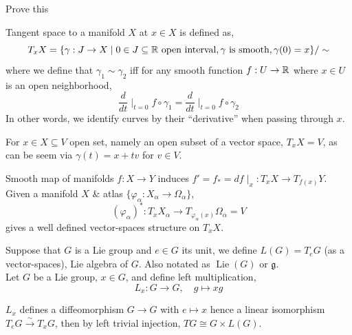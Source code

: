 \begin{exercise}
	Prove this
\end{exercise}
\begin{definition}
	Tangent space to a manifold $X$ at $x \in X$ is defined as,
	\[
		T_x X
		= \{ \gamma : J \to X \mid 0 \in J \subseteq \mathbb{R} \text{ open interval}, \gamma \text{ is smooth}, \gamma(0) = x \} / \sim
	\]
	where we define that $\gamma_1 \sim \gamma_2$ iff for any smooth function $f : U \to \mathbb{R}$ where $x \in U$ is an open neighborhood, 
	\[
		\frac{d}{dt} \mid_{t = 0} f \circ \gamma_1
		= \frac{d}{dt} \mid_{t = 0} f \circ \gamma_2
	\]
	In other words, we identify curves by their ``derivative'' when passing through $x$.
\end{definition}
\begin{example}
	For $x \in X \subseteq V$ open set, namely an open subset of a vector space, $T_x X = V$, as can be seem via $\gamma(t) = x + t v$ for $v \in V$.
\end{example}
Smooth map of manifolds $f : X \to Y$ induces $f' = f_* = df \mid_x : T_x X \to T_{f(x)} Y$. \\
Given a manifold $X$ \& atlas $\{ \varphi_{\alpha} : X_{\alpha} \to \Omega_{\alpha} \}$,
\[
	{(\varphi_{\alpha})}^* : T_x X_{\alpha} \to T_{\varphi_{\alpha}(x)} \Omega_{\alpha} = V
\]
gives a well defined vector-spaces structure on $T_x X$.
\begin{definition}
	Suppose that $G$ is a Lie group and $e \in G$ its unit, we define $L(G) = T_e G$ (as a vector-spaces),
	Lie algebra of $G$.
	Also notated as $\operatorname{Lie}(G)$ or $\mathfrak{g}$. \\
	Let $G$ be a Lie group, $x \in G$, and define left multiplication,
	\[
		L_x : G \to G,
		\quad
		g \mapsto x g
	\]
\end{definition}
$L_x$ defines a diffeomorphism $G \to G$ with $e \mapsto x$ hence a linear isomorphism $T_e G \xrightarrow{\sim} T_x G$, then by left trivial injection, $T G \cong G \times L(G)$.

\listoftheorems[title=definitions \& theorems,ignoreall,show={theorem,definition},swapnumber,onlynamed={proposition}]

